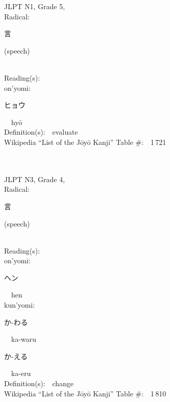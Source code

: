 \begin{multicols}{2}
{JLPT N1, Grade 5, \\Radical:\ \ {\begin{CJK}{UTF8}{min} 言 \end{CJK}} (speech) } \\
Reading(s):\ \ \\
{\hspace*{1em}}on'yomi:\ \ \\
{\hspace*{2em}}{\begin{CJK}{UTF8}{min} ヒョウ \end{CJK}}\ \ hy\=o\ \ \\
Definition(s):\ \ evaluate \\
Wikipedia ``List of the J\=oy\=o Kanji'' Table \#:\ \ 1\,721 \\
\ \ \\
{\fontsize{34pt}{40pt}  }\ \ \\  %
{JLPT N3, Grade 4, \\Radical:\ \ {\begin{CJK}{UTF8}{min} 言 \end{CJK}} (speech) } \\
Reading(s):\ \ \\
{\hspace*{1em}}on'yomi:\ \ \\
{\hspace*{2em}}{\begin{CJK}{UTF8}{min} ヘン \end{CJK}}\ \ hen\ \ \\
{\hspace*{1em}}kun'yomi:\ \ \\
{\hspace*{2em}}{\begin{CJK}{UTF8}{min} か-わる \end{CJK}}\ \ ka-waru\ \ \\
{\hspace*{2em}}{\begin{CJK}{UTF8}{min} か-える \end{CJK}}\ \ ka-eru\ \ \\
Definition(s):\ \ change \\
Wikipedia ``List of the J\=oy\=o Kanji'' Table \#:\ \ 1\,810 \\
\ \ \\
{\fontsize{34pt}{40pt}  }\ \ \\  %

\end{multicols}
